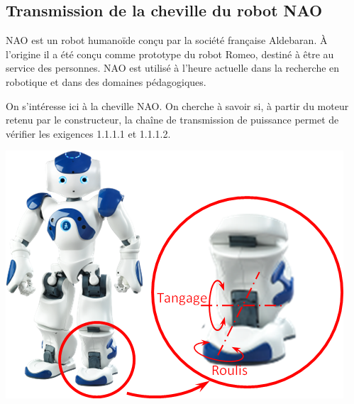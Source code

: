 \documentclass[10pt]{article}
\begin{document}



\setlength{\parskip}{0ex plus 0.2ex minus 0ex}
 \renewcommand{\contentsname}{}
 \renewcommand{\baselinestretch}{1}


 \renewcommand{\baselinestretch}{1.2}
\setlength{\parskip}{2ex plus 0.5ex minus 0.2ex}



\subsection*{Transmission de la cheville du robot NAO}
\begin{minipage}[c]{.63\linewidth}
NAO est un robot humanoïde conçu par la société française Aldebaran. \`A l'origine il a été conçu comme prototype du robot Romeo, destiné à être au service des personnes. NAO est utilisé à l'heure actuelle dans la recherche en robotique et dans des domaines pédagogiques. 
\begin{obj}
On s'intéresse ici à la cheville NAO. On cherche à savoir si, à partir du moteur retenu par le constructeur, la chaîne de transmission de puissance permet de vérifier les exigences 1.1.1.1 et 1.1.1.2.
\end{obj}
\end{minipage} \hfill
\begin{minipage}[c]{.35\linewidth}
\begin{center}
\includegraphics[width=.95\textwidth]{images/Cheville}
\end{center}
\end{minipage}
\end{document}

